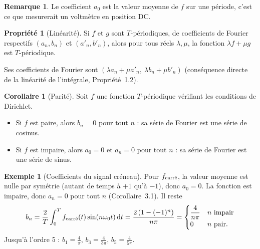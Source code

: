 \documentclass[a4paper,11pt]{article}
\theoremstyle{definition}
\newtheorem{proposition}{Propriété}[section]
\newtheorem{corollary}{Corollaire}[section]
\newtheorem{exemple}{Exemple}[section]
\newtheorem{remark}{Remarque}[section]
\begin{document}
\begin{remark}
    Le coefficient $a_0$ est la valeur moyenne de $f$ sur une période, c'est ce que mesurerait un voltmètre en position DC.
\end{remark}

\begin{proposition}[Linéarité]
    Si $f$ et $g$ sont $T$-périodiques, de coefficients de Fourier respectifs $(a_n,b_n)$ et $(a'_n,b'_n)$, alors pour tous réels $\lambda,\mu$, la fonction $\lambda f+\mu g$ est $T$-périodique.
    
    Ses coefficients de Fourier sont $(\lambda a_n+\mu a'_n,\ \lambda b_n+\mu b'_n)$ (conséquence directe de la linéarité de l'intégrale, Propriété~1.2).
\end{proposition}

\begin{corollary}[Parité]
    Soit $f$ une fonction $T$-périodique vérifiant les conditions de Dirichlet.
    \begin{itemize}
        \item
        Si $f$ est paire, alors $b_n=0$ pour tout $n$ : sa série de Fourier est une série de cosinus.
        \item
        Si $f$ est impaire, alors $a_0=0$ et $a_n=0$ pour tout $n$ : sa série de Fourier est une série de sinus.
    \end{itemize}
\end{corollary}


\begin{exemple}[Coefficients du signal créneau]
    Pour $f_{\rm carr\acute{e}}$, la valeur moyenne est nulle par symétrie (autant de temps à $+1$ qu'à $-1$), donc $a_0=0$. La fonction est impaire, donc $a_n=0$ pour tout $n$ (Corollaire~3.1). Il reste
    $$
        b_n = \frac2T\int_0^T f_{\rm carr\acute{e}}(t)\sin(n\omega_0 t)\,{\rm d} t = \frac{2\left(1-(-1)^n\right)}{n\pi} = \begin{cases} \dfrac{4}{n\pi} & n \text{ impair} \\ 0 & n \text{ pair.} \end{cases}
    $$
    Jusqu'à l'ordre 5 : $b_1 = \frac{4}{\pi}$, $b_3 = \frac{4}{3\pi}$, $b_5 = \frac{4}{5\pi}$.
\end{exemple}
\end{document}
